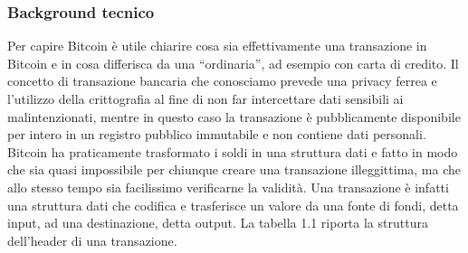 \subsubsection{Background tecnico}
\cite{masteringbitcoin,bitcoinofficialdoc,bitcoinwiki}Per capire Bitcoin è utile chiarire cosa sia effettivamente una transazione in Bitcoin e in cosa differisca da una “ordinaria”, ad esempio con carta di credito. Il concetto di transazione bancaria che conosciamo prevede una privacy ferrea e l’utilizzo della crittografia al fine di non far intercettare dati sensibili ai malintenzionati, mentre in questo caso la transazione è pubblicamente disponibile per intero in un registro pubblico immutabile e non contiene dati personali. Bitcoin ha praticamente trasformato i soldi in una struttura dati e fatto in modo che sia quasi impossibile per chiunque creare una transazione illeggittima, ma che allo stesso tempo sia facilissimo verificarne la validità. Una transazione è infatti una struttura dati che codifica e trasferisce un valore da una fonte di fondi, detta input, ad una destinazione, detta output. La tabella 1.1 riporta la struttura dell'header di una transazione.

\begin{table}[ht]
	\centering
\caption{Struttura dell'header di una transazione (Fonte Bitcoin \cite{masteringbitcoin}).}
\end{table}


